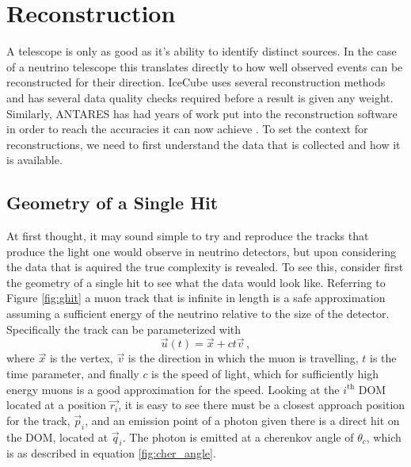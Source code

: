 \chapter{Reconstruction}

A telescope is only as good as it's ability to identify distinct sources. In the case of a neutrino telescope this translates directly to how well observed events can be reconstructed for their direction. IceCube uses several reconstruction methods \cite{icecube} and has several data quality checks required before a result is given any weight. Similarly, ANTARES has had years of work put into the reconstruction software in order to reach the accuracies it can now achieve \cite{antares}. To set the context for reconstructions, we need to first understand the data that is collected and how it is available. 

\section{Geometry of a Single Hit}

At first thought, it may sound simple to try and reproduce the tracks that produce the light one would observe in neutrino detectors, but upon considering the data that is aquired the true complexity is revealed. To see this, consider first the geometry of a single hit to see what the data would look like. Referring to Figure \ref{fig:ghit} a muon track that is infinite in length is a safe approximation assuming a sufficient energy of the neutrino relative to the size of the detector. Specifically the track can be parameterized with
\begin{equation}\label{eq:track}
  \vec{u}(t) = \vec{x} + ct\vec{v}\, ,
\end{equation}
where $\vec{x}$ is the vertex, $\vec{v}$ is the direction in which the muon is travelling, $t$ is the time parameter, and finally $c$ is the speed of light, which for sufficiently high energy muons is a good approximation for the speed. Looking at the $i^{\text{th}}$ DOM located at a position $\vec{r_{i}}$, it is easy to see there must be a closest approach position for the track, $\vec{p}_{i}$, and an emission point of a photon given there is a direct hit on the DOM, located at $\vec{q}_{i}$. The photon is emitted at a cherenkov angle of $\theta_{c}$, which is as described in equation \ref{fig:cher_angle}. 


